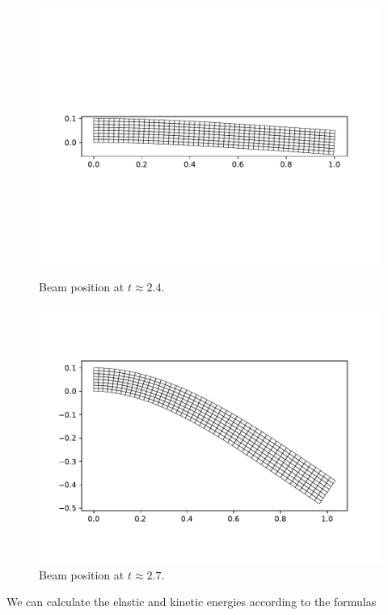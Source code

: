 \documentclass{report}
\begin{document}
\begin{figure}[h]
\centering
\begin{minipage}[t]{0.45\textwidth}
\centering
\includegraphics[width=\textwidth]{../Plots/Project3_main/Figure_10.pdf}
\caption{Beam position at $t\approx2.4$.}
\label{pl:beam_soln_position2}
\end{minipage}
\hfill
\begin{minipage}[t]{0.45\textwidth}
\centering
\includegraphics[width=\textwidth]{../Plots/Project3_main/Figure_12.pdf}
\caption{Beam position at $t\approx2.7$.}
\label{pl:beam_soln_position3}
\end{minipage}

\end{figure} We can calculate the elastic and kinetic energies according to the formulas
\end{document}
